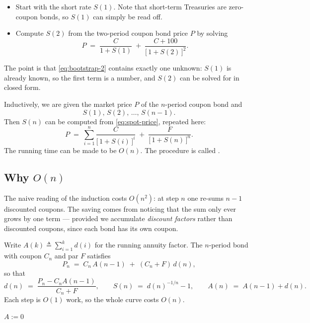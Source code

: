 \begin{itemize}[itemsep=0.35em]
	\item Start with the short rate $S(1)$.
	      Note that short-term Treasuries are zero-coupon bonds, so $S(1)$ can simply be read off.
	\item Compute $S(2)$ from the two-period coupon bond price $P$ by solving
	      \begin{equation}
		      P \;=\; \frac{C}{1+S(1)} \;+\; \frac{C+100}{\bigl[\,1+S(2)\,\bigr]^{2}} . \label{eq:bootstrap-2}
	      \end{equation}
\end{itemize}

The point is that \eqref{eq:bootstrap-2} contains exactly one unknown: $S(1)$ is already known, so the first term is a number, and $S(2)$ can be solved for in closed form.


Inductively, we are given the market price $P$ of the $n$-period coupon bond and
\[
	S(1),\,S(2),\,\ldots,\,S(n-1) .
\]
Then $S(n)$ can be computed from \eqref{eq:spot-price}, repeated here:
\[
	P \;=\; \sum_{i=1}^{n}\frac{C}{\bigl[\,1+S(i)\,\bigr]^{i}}
	\;+\; \frac{F}{\bigl[\,1+S(n)\,\bigr]^{n}} .
\]
The running time can be made to be $O(n)$.
The procedure is called .

\subsection{Why \texorpdfstring{$O(n)$}{O(n)}}

\suppstart
The naive reading of the induction costs $O(n^{2})$: at step $n$ one re-sums $n-1$ discounted coupons.
The saving comes from noticing that the sum only ever grows by one term --- provided we accumulate \emph{discount factors} rather than discounted coupons, since each bond has its own coupon.

Write $A(k) \triangleq \sum_{i=1}^{k} d(i)$ for the running annuity factor.
The $n$-period bond with coupon $C_{n}$ and par $F$ satisfies
\[
	P_{n} \;=\; C_{n}\,A(n-1) \;+\; (C_{n}+F)\,d(n) ,
\]
so that
\begin{equation}
	d(n) \;=\; \frac{P_{n} - C_{n}A(n-1)}{C_{n}+F} ,
	\qquad
	S(n) \;=\; d(n)^{-1/n} - 1 ,
	\qquad
	A(n) \;=\; A(n-1) + d(n) . \label{eq:bootstrap-step}
\end{equation}
Each step is $O(1)$ work, so the whole curve costs $O(n)$.

\begin{algorithm}[H]
	\caption{Bootstrapping the spot rate curve}
	\label{alg:bootstrap}
	$A := 0$\;
	\;
\end{algorithm}


